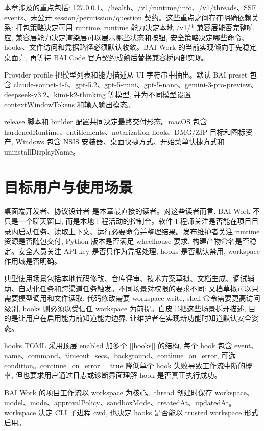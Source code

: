 本章涉及的重点包括: 127.0.0.1、/health、/v1/runtime/info、/v1/threads、SSE events、未公开 session/permission/question 契约。这些重点之间存在明确依赖关系: 打包策略决定可用 runtime, runtime 能力决定本地 /v1/* 兼容层能否完整响应, 兼容层能力决定渲染层可以展示哪些状态和按钮, 安全策略决定哪些命令、hooks、文件访问和凭据路径必须默认收敛。BAI Work 的当前实现倾向于先稳定桌面壳, 再等待 BAI Code 官方契约成熟后替换兼容桥内部实现。

Provider profile 把模型列表和能力描述从 UI 字符串中抽出。默认 BAI preset 包含 claude-sonnet-4-6、gpt-5.2、gpt-5-mini、gpt-5-nano、gemini-3-pro-preview、deepseek-v3.2、kimi-k2-thinking 等模型, 并为不同模型设置 contextWindowTokens 和输入输出模态。

release 脚本和 builder 配置共同决定最终交付形态。macOS 包含 hardenedRuntime、entitlements、notarization hook、DMG/ZIP 目标和图标资产, Windows 包含 NSIS 安装器、桌面快捷方式、开始菜单快捷方式和 uninstallDisplayName。

\section{目标用户与使用场景}
桌面端开发者、协议设计者 是本章最直接的读者。对这些读者而言, BAI Work 不只是一个聊天窗口, 而是本地工程活动的控制台。软件工程师关注是否能在项目目录内启动任务、读取上下文、运行必要命令并整理结果。发布维护者关注 runtime 资源是否随包交付, Python 版本是否满足 wheelhouse 要求, 构建产物命名是否稳定。安全人员关注 API key 是否只作为凭据处理, hooks 是否默认禁用, workspace 作用域是否明确。

典型使用场景包括本地代码修改、仓库评审、技术方案草拟、文档生成、调试辅助、自动化任务和跨渠道任务触发。不同场景对权限的要求不同: 文档草拟可以只需要模型调用和文件读取, 代码修改需要 workspace-write, shell 命令需要更高访问级别, hooks 则必须以受信任 workspace 为前提。白皮书把这些场景拆开描述, 目的是让用户在启用能力前知道能力边界, 让维护者在实现新功能时知道默认安全姿态。

hooks TOML 采用顶层 enabled 加多个 [[hooks]] 的结构, 每个 hook 包含 event、name、command、timeout\_secs、background、continue\_on\_error, 可选 condition。continue\_on\_error = true 降低单个 hook 失败导致工作流中断的概率, 但也要求用户通过日志或诊断界面理解 hook 是否真正执行成功。

BAI Work 的项目工作流以 workspace 为核心。thread 创建时保存 workspace、model、mode、approvalPolicy、sandboxMode、createdAt、updatedAt。workspace 决定 CLI 子进程 cwd, 也决定 hooks 是否能以 trusted workspace 形式启用。

